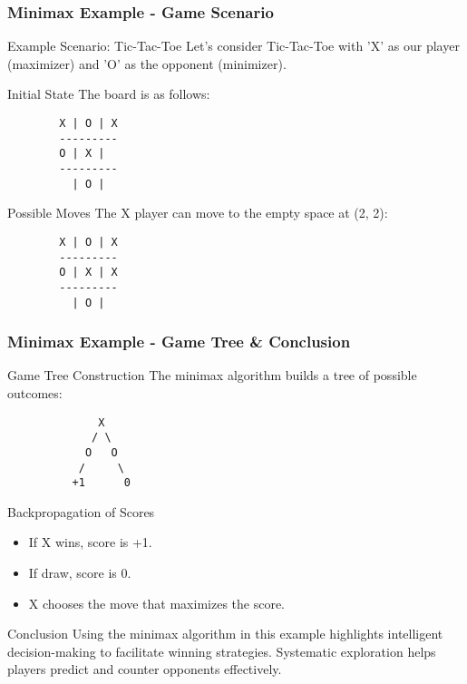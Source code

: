 \documentclass[aspectratio=169]{beamer}
\begin{document}
\begin{frame}[fragile]
    \frametitle{Minimax Example - Game Scenario}
    \begin{block}{Example Scenario: Tic-Tac-Toe}
        Let's consider Tic-Tac-Toe with 'X' as our player (maximizer) and 'O' as the opponent (minimizer).
    \end{block}

    \begin{block}{Initial State}
        The board is as follows:
        \begin{lstlisting}
        X | O | X
        ---------
        O | X |
        ---------
          | O |
        \end{lstlisting}
    \end{block}

    \begin{block}{Possible Moves}
        The X player can move to the empty space at (2, 2):
        \begin{lstlisting}
        X | O | X
        ---------
        O | X | X
        ---------
          | O |
        \end{lstlisting}
    \end{block}
\end{frame}

\begin{frame}[fragile]
    \frametitle{Minimax Example - Game Tree & Conclusion}
    \begin{block}{Game Tree Construction}
        The minimax algorithm builds a tree of possible outcomes:
        \begin{lstlisting}
              X
             / \
            O   O
           /     \
          +1      0
        \end{lstlisting}
    \end{block}

    \begin{block}{Backpropagation of Scores}
        \begin{itemize}
            \item If X wins, score is +1.
            \item If draw, score is 0.
            \item X chooses the move that maximizes the score.
        \end{itemize}
    \end{block}
    
    \begin{block}{Conclusion}
        Using the minimax algorithm in this example highlights intelligent decision-making to facilitate winning strategies. Systematic exploration helps players predict and counter opponents effectively.
    \end{block}
\end{frame}
\end{document}
